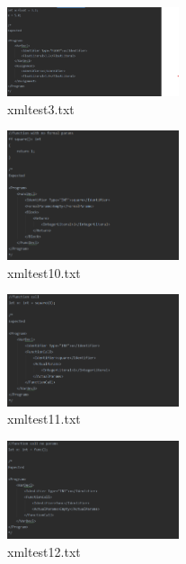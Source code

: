 \documentclass{article}
\begin{document}
\begin{multicols}{2}
					
										\begin{figure}[H]
					\centering
			 			\includegraphics[width=0.45\textwidth]{xmltest3.png}
			 			\centering
			  			\caption{xmltest3.txt}
			  			\label{fig:xmltest3}
					\end{figure}
					
					
												\begin{figure}[H]
					\centering
			 			\includegraphics[width=0.45\textwidth]{xmltest10.png}
			 			\centering
			  			\caption{xmltest10.txt}
			  			\label{fig:xmltest10}
					\end{figure}
					
			
					
					\begin{figure}[H]
					\centering
			 			\includegraphics[width=0.45\textwidth]{xmltest11.png}
			 			\centering
			  			\caption{xmltest11.txt}
			  			\label{fig:xmltest11}
					\end{figure}
					
					\begin{figure}[H]
					\centering
			 			\includegraphics[width=0.45\textwidth]{xmltest12.png}
			 			 \centering
			  			\caption{xmltest12.txt}
			  			\label{fig:xmltest12}
					\end{figure}
					

\end{multicols}
\end{document}
